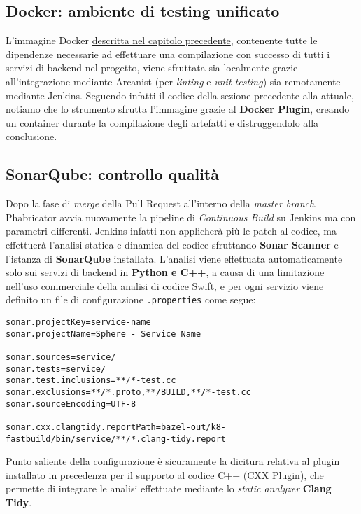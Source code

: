 \documentclass[../main.tex]{subfiles}
\begin{document}
        	\subsection{Docker: ambiente di testing unificato}
        	
        	    L'immagine Docker \hyperref[sec:cloud_arch_docker]{descritta nel capitolo precedente}, contenente tutte le dipendenze necessarie ad effettuare una compilazione con successo di tutti i servizi di backend nel progetto, viene sfruttata sia localmente grazie all'integrazione mediante Arcanist (per \emph{linting} e \emph{unit testing}) sia remotamente mediante Jenkins. Seguendo infatti il codice della sezione precedente alla attuale, notiamo che lo strumento sfrutta l'immagine grazie al \textbf{Docker Plugin}, creando un container durante la compilazione degli artefatti e distruggendolo alla conclusione.
        	
        	\subsection{SonarQube: controllo qualità}
        	
        	    Dopo la fase di \emph{merge} della Pull Request all'interno della \emph{master branch}, Phabricator avvia nuovamente la pipeline di \emph{Continuous Build} su Jenkins ma con parametri differenti. Jenkins infatti non applicherà più le patch al codice, ma effettuerà l'analisi statica e dinamica del codice sfruttando \textbf{Sonar Scanner} e l'istanza di \textbf{SonarQube} installata. L'analisi viene effettuata automaticamente solo sui servizi di backend in \textbf{Python e C++}, a causa di una limitazione nell'uso commerciale della analisi di codice Swift, e per ogni servizio viene definito un file di configurazione \verb|.properties| come segue:
        	    \begin{lstlisting}
sonar.projectKey=service-name
sonar.projectName=Sphere - Service Name

sonar.sources=service/
sonar.tests=service/
sonar.test.inclusions=**/*-test.cc
sonar.exclusions=**/*.proto,**/BUILD,**/*-test.cc
sonar.sourceEncoding=UTF-8

sonar.cxx.clangtidy.reportPath=bazel-out/k8-fastbuild/bin/service/**/*.clang-tidy.report
        	    \end{lstlisting}
        	    
        	    Punto saliente della configurazione è sicuramente la dicitura relativa al plugin installato in precedenza per il supporto al codice C++ (CXX Plugin), che permette di integrare le analisi effettuate mediante lo \emph{static analyzer} \textbf{Clang Tidy}.
        	    
\end{document}
